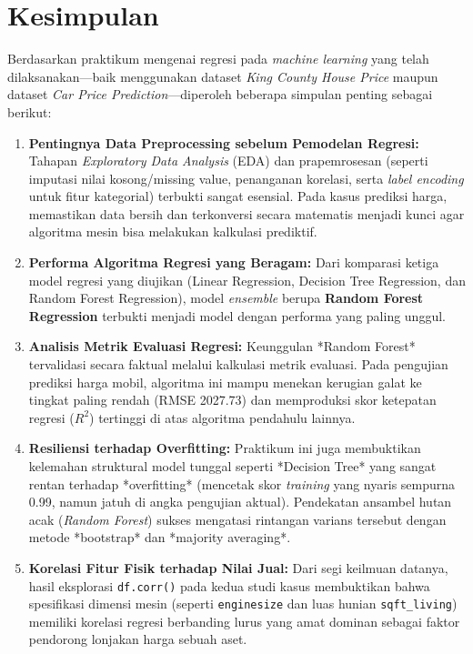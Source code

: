 \chapter{Kesimpulan}
\label{chap:kesimpulan}
Berdasarkan praktikum mengenai regresi pada \textit{machine learning} yang telah dilaksanakan—baik menggunakan dataset \textit{King County House Price} maupun dataset \textit{Car Price Prediction}—diperoleh beberapa simpulan penting sebagai berikut:

\begin{enumerate}
    \item \textbf{Pentingnya Data Preprocessing sebelum Pemodelan Regresi:} Tahapan \textit{Exploratory Data Analysis} (EDA) dan prapemrosesan (seperti imputasi nilai kosong/missing value, penanganan korelasi, serta \textit{label encoding} untuk fitur kategorial) terbukti sangat esensial. Pada kasus prediksi harga, memastikan data bersih dan terkonversi secara matematis menjadi kunci agar algoritma mesin bisa melakukan kalkulasi prediktif.
    
    \item \textbf{Performa Algoritma Regresi yang Beragam:} Dari komparasi ketiga model regresi yang diujikan (Linear Regression, Decision Tree Regression, dan Random Forest Regression), model \textit{ensemble} berupa \textbf{Random Forest Regression} terbukti menjadi model dengan performa yang paling unggul.
    
    \item \textbf{Analisis Metrik Evaluasi Regresi:} Keunggulan *Random Forest* tervalidasi secara faktual melalui kalkulasi metrik evaluasi. Pada pengujian prediksi harga mobil, algoritma ini mampu menekan kerugian galat ke tingkat paling rendah (RMSE 2027.73) dan memproduksi skor ketepatan regresi ($R^2$) tertinggi di atas algoritma pendahulu lainnya.
    
    \item \textbf{Resiliensi terhadap Overfitting:} Praktikum ini juga membuktikan kelemahan struktural model tunggal seperti *Decision Tree* yang sangat rentan terhadap *overfitting* (mencetak skor \textit{training} yang nyaris sempurna 0.99, namun jatuh di angka pengujian aktual). Pendekatan ansambel hutan acak (\textit{Random Forest}) sukses mengatasi rintangan varians tersebut dengan metode *bootstrap* dan *majority averaging*.
    
    \item \textbf{Korelasi Fitur Fisik terhadap Nilai Jual:} Dari segi keilmuan datanya, hasil eksplorasi \texttt{df.corr()} pada kedua studi kasus membuktikan bahwa spesifikasi dimensi mesin (seperti \texttt{enginesize} dan luas hunian \texttt{sqft\_living}) memiliki korelasi regresi berbanding lurus yang amat dominan sebagai faktor pendorong lonjakan harga sebuah aset.
\end{enumerate}
